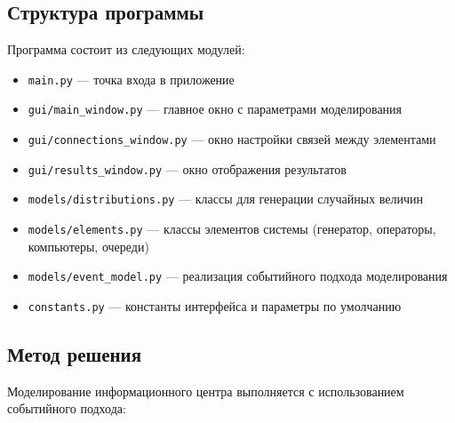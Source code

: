 \subsection{Структура программы}

Программа состоит из следующих модулей:

\begin{itemize}
    \item \texttt{main.py} — точка входа в приложение
    \item \texttt{gui/main\_window.py} — главное окно с параметрами моделирования
    \item \texttt{gui/connections\_window.py} — окно настройки связей между элементами
    \item \texttt{gui/results\_window.py} — окно отображения результатов
    \item \texttt{models/distributions.py} — классы для генерации случайных величин
    \item \texttt{models/elements.py} — классы элементов системы (генератор, операторы, компьютеры, очереди)
    \item \texttt{models/event\_model.py} — реализация событийного подхода моделирования
    \item \texttt{constants.py} — константы интерфейса и параметры по умолчанию
\end{itemize}

\subsection{Метод решения}

Моделирование информационного центра выполняется с использованием событийного подхода:

